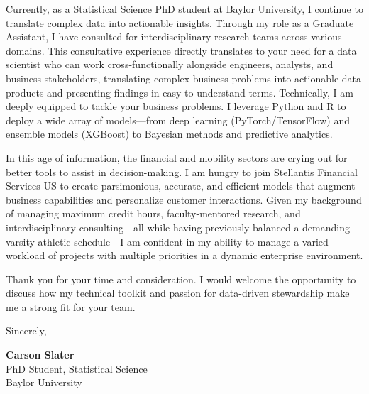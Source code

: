 \documentclass[11pt]{article}
\begin{document}
Currently, as a Statistical Science PhD student at Baylor University, I continue to translate complex data into actionable insights. Through my role as a Graduate Assistant, I have consulted for interdisciplinary research teams across various domains. This consultative experience directly translates to your need for a data scientist who can work cross-functionally alongside engineers, analysts, and business stakeholders, translating complex business problems into actionable data products and presenting findings in easy-to-understand terms. Technically, I am deeply equipped to tackle your business problems. I leverage Python and R to deploy a wide array of models---from deep learning (PyTorch/TensorFlow) and ensemble models (XGBoost) to Bayesian methods and predictive analytics.

In this age of information, the financial and mobility sectors are crying out for better tools to assist in decision-making. I am hungry to join Stellantis Financial Services US to create parsimonious, accurate, and efficient models that augment business capabilities and personalize customer interactions. Given my background of managing maximum credit hours, faculty-mentored research, and interdisciplinary consulting---all while having previously balanced a demanding varsity athletic schedule---I am confident in my ability to manage a varied workload of projects with multiple priorities in a dynamic enterprise environment.

Thank you for your time and consideration. I would welcome the opportunity to discuss how my technical toolkit and passion for data-driven stewardship make me a strong fit for your team.

\vspace{1em}
\noindent
Sincerely,

\vspace{1em}
\noindent
\textbf{Carson Slater} \\
PhD Student, Statistical Science \\
Baylor University
\end{document}
